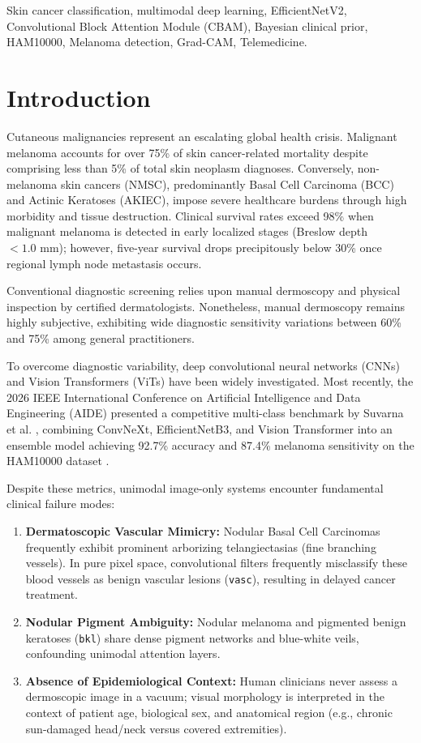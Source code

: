 ﻿\documentclass[conference]{IEEEtran}
\begin{document}
\begin{IEEEkeywords}
Skin cancer classification, multimodal deep learning, EfficientNetV2, Convolutional Block Attention Module (CBAM), Bayesian clinical prior, HAM10000, Melanoma detection, Grad-CAM, Telemedicine.
\end{IEEEkeywords}

\section{Introduction}
Cutaneous malignancies represent an escalating global health crisis. Malignant melanoma accounts for over 75\% of skin cancer-related mortality despite comprising less than 5\% of total skin neoplasm diagnoses. Conversely, non-melanoma skin cancers (NMSC), predominantly Basal Cell Carcinoma (BCC) and Actinic Keratoses (AKIEC), impose severe healthcare burdens through high morbidity and tissue destruction. Clinical survival rates exceed 98\% when malignant melanoma is detected in early localized stages (Breslow depth $< 1.0\text{ mm}$); however, five-year survival drops precipitously below 30\% once regional lymph node metastasis occurs.

Conventional diagnostic screening relies upon manual dermoscopy and physical inspection by certified dermatologists. Nonetheless, manual dermoscopy remains highly subjective, exhibiting wide diagnostic sensitivity variations between 60\% and 75\% among general practitioners. 

To overcome diagnostic variability, deep convolutional neural networks (CNNs) and Vision Transformers (ViTs) have been widely investigated. Most recently, the 2026 IEEE International Conference on Artificial Intelligence and Data Engineering (AIDE) presented a competitive multi-class benchmark by Suvarna et al. \cite{suvarna2026}, combining ConvNeXt, EfficientNetB3, and Vision Transformer into an ensemble model achieving 92.7\% accuracy and 87.4\% melanoma sensitivity on the HAM10000 dataset \cite{tschandl2018ham10000}.

Despite these metrics, unimodal image-only systems encounter fundamental clinical failure modes:
\begin{enumerate}
    \item \textbf{Dermatoscopic Vascular Mimicry:} Nodular Basal Cell Carcinomas frequently exhibit prominent arborizing telangiectasias (fine branching vessels). In pure pixel space, convolutional filters frequently misclassify these blood vessels as benign vascular lesions (\texttt{vasc}), resulting in delayed cancer treatment.
    \item \textbf{Nodular Pigment Ambiguity:} Nodular melanoma and pigmented benign keratoses (\texttt{bkl}) share dense pigment networks and blue-white veils, confounding unimodal attention layers.
    \item \textbf{Absence of Epidemiological Context:} Human clinicians never assess a dermoscopic image in a vacuum; visual morphology is interpreted in the context of patient age, biological sex, and anatomical region (e.g., chronic sun-damaged head/neck versus covered extremities).
\end{enumerate}
\end{document}
